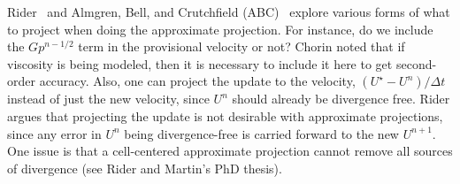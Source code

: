 Rider~\cite{rider} and Almgren, Bell, and Crutchfield (ABC)~\cite{ABC}
explore various forms of what to project when doing the approximate
projection.  For instance, do we include the $Gp^{n-1/2}$ term in the
provisional velocity or not?  Chorin noted that if viscosity is being
modeled, then it is necessary to include it here to get second-order
accuracy.  Also, one can project the update to the velocity, $(U^\star
- U^n)/\Delta t$ instead of just the new velocity, since $U^n$ should
already be divergence free.  Rider argues that projecting the update
is not desirable with approximate projections, since any error in
$U^n$ being divergence-free is carried forward to the new $U^{n+1}$.
One issue is that a cell-centered approximate projection cannot remove
all sources of divergence (see Rider and Martin's PhD thesis).


